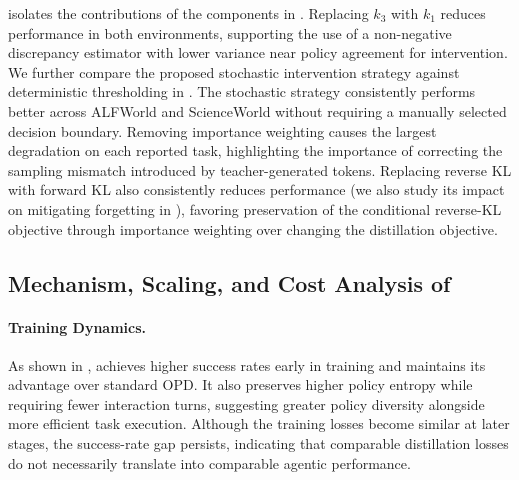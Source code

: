 \vspace{-0.5em}


 isolates the contributions of the components in \name.
Replacing $k_3$ with $k_1$ reduces performance in both environments, supporting the use of a non-negative discrepancy estimator with lower variance near policy agreement for intervention.
We further compare the proposed stochastic intervention strategy against deterministic thresholding in . The stochastic strategy consistently performs better across ALFWorld and ScienceWorld without requiring a manually selected decision boundary.
Removing importance weighting causes the largest degradation on each reported task, highlighting the importance of correcting the sampling mismatch introduced by teacher-generated tokens.
Replacing reverse KL with forward KL also consistently reduces performance (we also study its impact on mitigating forgetting in ), favoring preservation of the conditional reverse-KL objective through importance weighting over changing the distillation objective.



\subsection{Mechanism, Scaling, and Cost Analysis of \name}
\label{sec:analysis}

\vspace{-0.5em}
\paragraph{Training Dynamics.}
As shown in , \name achieves higher success rates early in training and maintains its advantage over standard OPD.
It also preserves higher policy entropy while requiring fewer interaction turns, suggesting greater policy diversity alongside more efficient task execution.
Although the training losses become similar at later stages, the success-rate gap persists, indicating that comparable distillation losses do not necessarily translate into comparable agentic performance.


